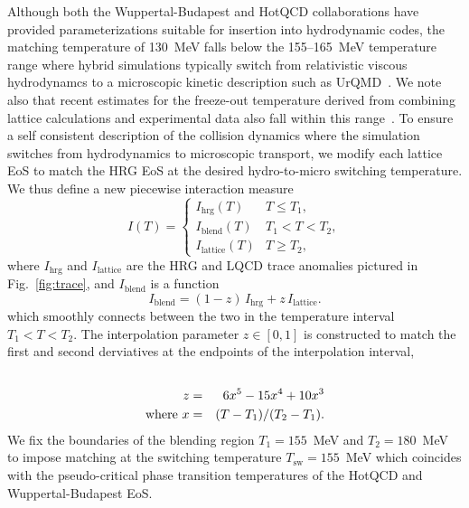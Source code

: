 \documentclass[aps,prc,reprint,amsmath,nofootinbib,superscriptaddress]{revtex4-1}
\begin{document}
Although both the Wuppertal-Budapest and HotQCD collaborations have provided parameterizations suitable for insertion into hydrodynamic codes, the matching temperature of 130~MeV falls below the 155--165~MeV temperature range where hybrid simulations typically switch from relativistic viscous hydrodynamcs to a microscopic kinetic description such as UrQMD~\cite{Bass:1998ca,Bleicher:1999xi}.  
We note also that recent estimates for the freeze-out temperature derived from combining lattice calculations and experimental data also fall within this range~\cite{Bazavov:2014xya, Adare:2015aqk}.  
To ensure a self consistent description of the collision dynamics where the simulation switches from hydrodynamics to microscopic transport, we modify each lattice EoS to match the HRG EoS at the desired hydro-to-micro switching temperature. We thus define a new piecewise interaction measure
\begin{equation}
 \label{interaction}
 I(T) =
  \begin{cases}
   I_\text{hrg}(T)	& T \le T_1, \\
   I_\text{blend}(T)	& T_1 < T < T_2, \\ 
   I_\text{lattice}(T)	& T \ge T_2,
  \end{cases}
\end{equation}
where $I_\text{hrg}$ and $I_\text{lattice}$ are the HRG and LQCD trace anomalies pictured in Fig.~\ref{fig:trace}, and $I_\text{blend}$ is a function 
\begin{equation}
  \label{interpolation}
  I_\text{blend} = (1-z)\, I_\text{hrg} + z\, I_\text{lattice}.
\end{equation}
which smoothly connects between the two in the temperature interval $T_1 < T < T_2$. The interpolation parameter $z \in [0,1]$ is constructed to match the first and second derviatives at the endpoints of the interpolation interval,
\begin{eqnarray}
 \label{smoothstep}
 \cr z &=& 6 x^5 - 15 x^4 + 10 x^3 \\
  \text{where } x &=& (T - T_1)/(T_2 - T_1).
\end{eqnarray}
We fix the boundaries of the blending region $T_1=155$~MeV and $T_2=180$~MeV to impose matching at the switching temperature $T_\text{sw} = 155$~MeV which coincides with the pseudo-critical phase transition temperatures of the HotQCD and Wuppertal-Budapest EoS. 
\end{document}
